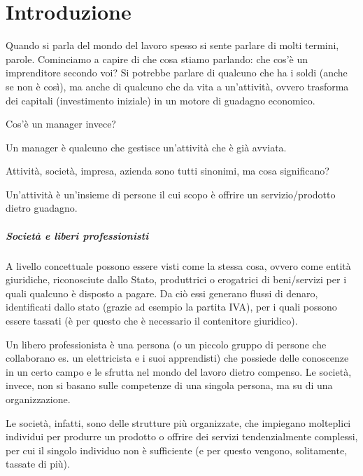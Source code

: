 \chapter{Introduzione}

Quando si parla del mondo del lavoro spesso si sente parlare di molti termini,
parole. Cominciamo a capire di che cosa stiamo parlando: che cos'è un
imprenditore secondo voi? Si potrebbe parlare di qualcuno che ha i soldi (anche
se non è così), ma anche di qualcuno che da vita a un'attività, ovvero
trasforma dei capitali (investimento iniziale) in un motore di guadagno
economico.

Cos'è un manager invece?
\begin{definition}[Manager]
Un manager è qualcuno che gestisce un'attività che è già avviata.
\end{definition}

Attività, società, impresa, azienda sono tutti sinonimi, ma cosa significano?
\begin{definition}[Attività]
Un'attività è un'insieme di persone il cui scopo è offrire un servizio/prodotto
dietro guadagno.
\end{definition}

\paragraph*{Società e liberi professionisti} A livello concettuale possono
essere visti come la stessa cosa, ovvero come entità giuridiche, riconosciute
dallo Stato, produttrici o erogatrici di beni/servizi per i quali qualcuno è
disposto a pagare. Da ciò essi generano flussi di denaro, identificati dallo
stato (grazie ad esempio la partita IVA), per i quali possono essere tassati (è
per questo che è necessario il contenitore giuridico).

\begin{definition}
Un libero professionista è una persona (o un piccolo gruppo di
persone che collaborano es. un elettricista e i suoi apprendisti) che possiede
delle conoscenze in un certo campo e le sfrutta nel mondo del lavoro dietro
compenso. Le società, invece, non si basano sulle competenze di una singola
persona, ma su di una organizzazione.
\end{definition}

\noindent Le società, infatti, sono delle strutture più organizzate, che
impiegano molteplici individui per produrre un prodotto o offrire dei servizi
tendenzialmente complessi, per cui il singolo individuo non è
sufficiente (e per questo vengono, solitamente, tassate di più).

